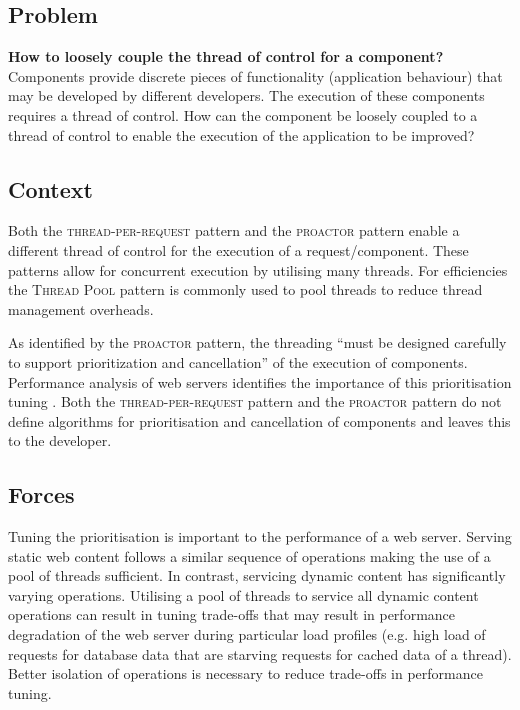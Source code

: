 \documentclass[prodmode]{style/acmlarge}
\begin{document}
\subsection{Problem}

\textbf{How to loosely couple the thread of control for a component?} 
Components provide discrete pieces of functionality (application behaviour) that
may be developed by different developers.  The execution of these components
requires a thread of control.  How can the component be loosely coupled to a
thread of control to enable the execution of the application to be improved?


\subsection{Context}

Both the \textsc{thread-per-request} pattern \cite{thread-per-request} and the
\textsc{proactor} pattern \cite{proactor} enable a different thread of control
for the execution of a request/component.  These patterns allow for concurrent
execution by utilising many threads.  For efficiencies the \textsc{Thread Pool}
pattern \cite{thread-per-request} is commonly used to pool threads to reduce
thread management overheads.

As identified by the \textsc{proactor} pattern, the threading ``must be designed
carefully to support prioritization and cancellation'' \cite[p. 8]{proactor} of
the execution of components.  Performance analysis of web servers identifies the
importance of this prioritisation tuning
\cite{tuning-important,low-server-footprint,tuning-os-important}.  Both the
\textsc{thread-per-request} pattern and the \textsc{proactor} pattern do not
define algorithms for prioritisation and cancellation of components and leaves
this to the developer.


\subsection{Forces}

Tuning the prioritisation is important to the performance of a web server.
Serving static web content follows a similar sequence of operations making the
use of a pool of threads sufficient.  In contrast, servicing dynamic content has
significantly varying operations.  Utilising a pool of threads to service all
dynamic content operations can result in tuning trade-offs that may result in
performance degradation of the web server during particular load profiles (e.g.
high load of requests for database data that are starving requests for cached
data of a thread).  Better isolation of operations is necessary to reduce
trade-offs in performance tuning.
\end{document}
